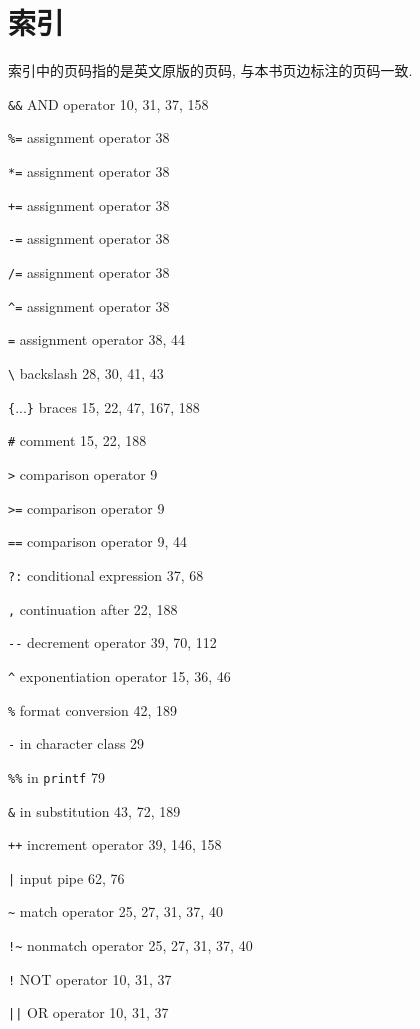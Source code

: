 \chapter{索引}
\label{chap:index}

索引中的页码指的是英文原版的页码, 与本书页边标注的页码一致.

\begin{multicols}{2}
\footnotesize
\verb'&&' AND operator 10, 31, 37, 158

\verb'%=' assignment operator 38

\verb'*=' assignment operator 38

\verb'+=' assignment operator 38

\verb'-=' assignment operator 38

\verb'/=' assignment operator 38

\verb'^=' assignment operator 38

\verb'=' assignment operator 38, 44

\verb'\' backslash 28, 30, 41, 43

\verb'{'...\verb'}' braces 15, 22, 47, 167, 188

\verb'#' comment 15, 22, 188

\verb'>' comparison operator 9

\verb'>=' comparison operator 9

\verb'==' comparison operator 9, 44

\verb'?:' conditional expression 37, 68

\verb',' continuation after 22, 188

\verb'--' decrement operator 39, 70, 112

\verb'^' exponentiation operator 15, 36, 46

\verb'%' format conversion 42, 189

\verb'-' in character class 29

\verb'%%' in \verb'printf' 79

\verb'&' in substitution 43, 72, 189

\verb'++' increment operator 39, 146, 158

\verb'|' input pipe 62, 76

\verb'~' match operator 25, 27, 31, 37, 40

\verb'!~' nonmatch operator 25, 27, 31, 37, 40

\verb'!' NOT operator 10, 31, 37

\verb'||' OR operator 10, 31, 37


\end{multicols}
